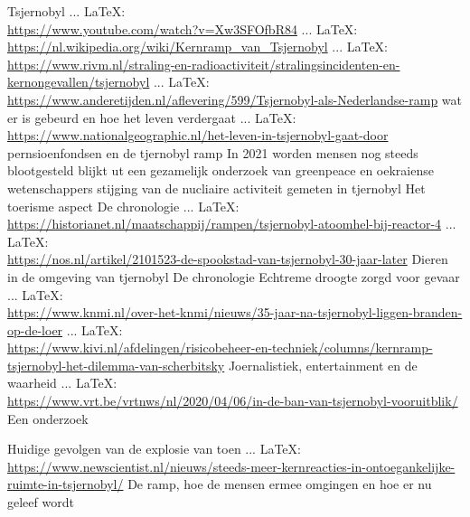 \begin{thebibliography}{99}
{{{	
	
	
	Tsjernobyl
	 ... \LaTeX:\\ \url{https://www.youtube.com/watch?v=Xw3SFOfbR84}
	 ... \LaTeX:\\ \url{https://nl.wikipedia.org/wiki/Kernramp_van_Tsjernobyl}
	 ... \LaTeX:\\ \url{https://www.rivm.nl/straling-en-radioactiviteit/stralingsincidenten-en-kernongevallen/tsjernobyl}
	 ... \LaTeX:\\ \url{https://www.anderetijden.nl/aflevering/599/Tsjernobyl-als-Nederlandse-ramp}
	wat er is gebeurd en hoe het leven verdergaat
	 ... \LaTeX:\\ \url{https://www.nationalgeographic.nl/het-leven-in-tsjernobyl-gaat-door}
	pernsioenfondsen en de tjernobyl ramp
	In 2021 worden mensen nog steeds blootgesteld blijkt ut een gezamelijk onderzoek van greenpeace en oekraiense wetenschappers
	stijging van de nucliaire activiteit gemeten in tjernobyl
	Het toerisme  aspect
	De chronologie
	 ... \LaTeX:\\ \url{https://historianet.nl/maatschappij/rampen/tsjernobyl-atoomhel-bij-reactor-4}
	 ... \LaTeX:\\ \url{https://nos.nl/artikel/2101523-de-spookstad-van-tsjernobyl-30-jaar-later}
	Dieren in de omgeving van tjernobyl
	De chronologie
	Echtreme droogte zorgd voor gevaar
	 ... \LaTeX:\\ \url{https://www.knmi.nl/over-het-knmi/nieuws/35-jaar-na-tsjernobyl-liggen-branden-op-de-loer}
	 ... \LaTeX:\\ \url{https://www.kivi.nl/afdelingen/risicobeheer-en-techniek/columns/kernramp-tsjernobyl-het-dilemma-van-scherbitsky}
	Joernalistiek, entertainment en de waarheid
	 ... \LaTeX:\\ \url{https://www.vrt.be/vrtnws/nl/2020/04/06/in-de-ban-van-tsjernobyl-vooruitblik/}
	Een onderzoek
	
	Huidige gevolgen van de explosie van toen
	 ... \LaTeX:\\ \url{https://www.newscientist.nl/nieuws/steeds-meer-kernreacties-in-ontoegankelijke-ruimte-in-tsjernobyl/}
	De ramp, hoe de mensen ermee omgingen en hoe er nu geleef wordt
	
}}}
\end{thebibliography}
